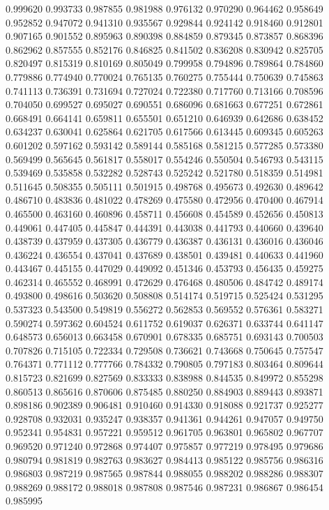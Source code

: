 0.999620
0.993733
0.987855
0.981988
0.976132
0.970290
0.964462
0.958649
0.952852
0.947072
0.941310
0.935567
0.929844
0.924142
0.918460
0.912801
0.907165
0.901552
0.895963
0.890398
0.884859
0.879345
0.873857
0.868396
0.862962
0.857555
0.852176
0.846825
0.841502
0.836208
0.830942
0.825705
0.820497
0.815319
0.810169
0.805049
0.799958
0.794896
0.789864
0.784860
0.779886
0.774940
0.770024
0.765135
0.760275
0.755444
0.750639
0.745863
0.741113
0.736391
0.731694
0.727024
0.722380
0.717760
0.713166
0.708596
0.704050
0.699527
0.695027
0.690551
0.686096
0.681663
0.677251
0.672861
0.668491
0.664141
0.659811
0.655501
0.651210
0.646939
0.642686
0.638452
0.634237
0.630041
0.625864
0.621705
0.617566
0.613445
0.609345
0.605263
0.601202
0.597162
0.593142
0.589144
0.585168
0.581215
0.577285
0.573380
0.569499
0.565645
0.561817
0.558017
0.554246
0.550504
0.546793
0.543115
0.539469
0.535858
0.532282
0.528743
0.525242
0.521780
0.518359
0.514981
0.511645
0.508355
0.505111
0.501915
0.498768
0.495673
0.492630
0.489642
0.486710
0.483836
0.481022
0.478269
0.475580
0.472956
0.470400
0.467914
0.465500
0.463160
0.460896
0.458711
0.456608
0.454589
0.452656
0.450813
0.449061
0.447405
0.445847
0.444391
0.443038
0.441793
0.440660
0.439640
0.438739
0.437959
0.437305
0.436779
0.436387
0.436131
0.436016
0.436046
0.436224
0.436554
0.437041
0.437689
0.438501
0.439481
0.440633
0.441960
0.443467
0.445155
0.447029
0.449092
0.451346
0.453793
0.456435
0.459275
0.462314
0.465552
0.468991
0.472629
0.476468
0.480506
0.484742
0.489174
0.493800
0.498616
0.503620
0.508808
0.514174
0.519715
0.525424
0.531295
0.537323
0.543500
0.549819
0.556272
0.562853
0.569552
0.576361
0.583271
0.590274
0.597362
0.604524
0.611752
0.619037
0.626371
0.633744
0.641147
0.648573
0.656013
0.663458
0.670901
0.678335
0.685751
0.693143
0.700503
0.707826
0.715105
0.722334
0.729508
0.736621
0.743668
0.750645
0.757547
0.764371
0.771112
0.777766
0.784332
0.790805
0.797183
0.803464
0.809644
0.815723
0.821699
0.827569
0.833333
0.838988
0.844535
0.849972
0.855298
0.860513
0.865616
0.870606
0.875485
0.880250
0.884903
0.889443
0.893871
0.898186
0.902389
0.906481
0.910460
0.914330
0.918088
0.921737
0.925277
0.928708
0.932031
0.935247
0.938357
0.941361
0.944261
0.947057
0.949750
0.952341
0.954831
0.957221
0.959512
0.961705
0.963801
0.965802
0.967707
0.969520
0.971240
0.972868
0.974407
0.975857
0.977219
0.978495
0.979686
0.980794
0.981819
0.982763
0.983627
0.984413
0.985122
0.985756
0.986316
0.986803
0.987219
0.987565
0.987844
0.988055
0.988202
0.988286
0.988307
0.988269
0.988172
0.988018
0.987808
0.987546
0.987231
0.986867
0.986454
0.985995

